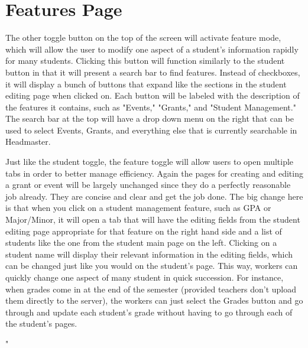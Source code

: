 \documentclass{article}
\begin{document}
\section{Features Page}

The other toggle  button on the top of the screen will activate feature mode, which will allow the user to modify one aspect of a student's information rapidly for many students. Clicking this button will function similarly to the student button in that it will present a search bar to find features. Instead of checkboxes, it will display a bunch of buttons that expand like the sections in the student editing page when clicked on. Each button will be labeled with the description of the features it contains, such as "Events," "Grants," and "Student Management." The search bar at the top will have a drop down menu on the right that can be used to select Events, Grants, and everything else that is currently searchable in Headmaster.

Just like the student toggle, the feature toggle will allow users to open multiple tabs in order to better manage efficiency. Again the pages for creating and editing a grant or event will be largely unchanged since they do a perfectly reasonable job already. They are concise and clear and get the job done. The big change here is that when you click on a student management feature, such as GPA or Major/Minor, it will open a tab that will have the editing fields from the student editing page appropriate for that feature on the right hand side and a list of students like the one from the student main page on the left. Clicking on a student name will display their relevant information in the editing fields, which can be changed just like you would on the student's page. This way, workers can quickly change one aspect of many student in quick succession. For instance, when grades come in at the end of the semester (provided teachers don't upload them directly to the server), the workers can just select the Grades button and go through and update each student's grade without having to go through each of the student's pages. 

"
\end{document}
